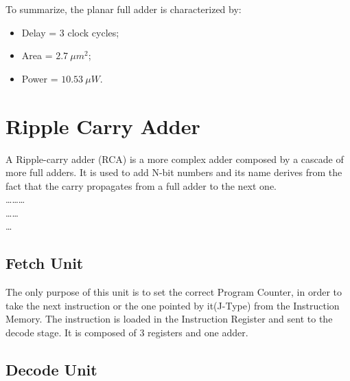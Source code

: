   



To summarize, the planar full adder is characterized by:
\begin{itemize}
\item Delay = 3 clock cycles;
\item Area = $2.7\ \mu m^2$;
\item Power = $10.53\ \mu W$.
\end{itemize}
	
\section{Ripple Carry Adder}

A Ripple-carry adder (RCA) is a more complex adder composed by a cascade of more full adders. It is used to add N-bit numbers and its name derives from the fact that the carry propagates from a full adder to the next one.\\
\dots \dots \dots \\
\dots \dots \\
\dots


\subsection{Fetch Unit}

The only purpose of this unit is to set the correct Program Counter, in order to take the next instruction or the one pointed by 
it(J-Type) from the Instruction Memory. The instruction is loaded in the Instruction Register and sent to the decode stage. It is composed
of 3 registers and one adder. 

\subsection{Decode Unit}

